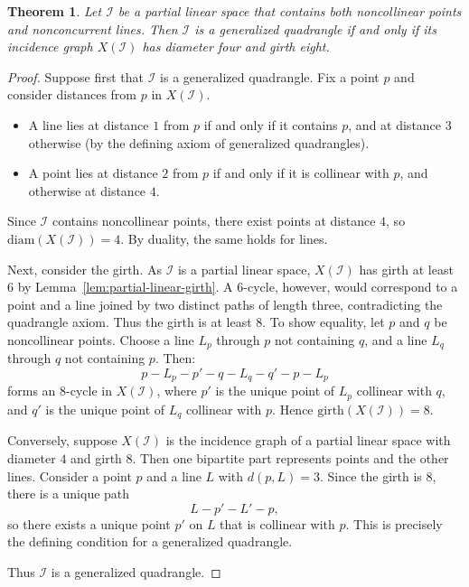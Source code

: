 \documentclass[12pt,a4paper,openany]{book}
\newtheorem{theorem}{Theorem}[section]
\begin{document}
\begin{theorem}\label{thm:gq-graph}
Let $\mathcal{I}$ be a partial linear space that contains both noncollinear points and nonconcurrent lines. Then $\mathcal{I}$ is a generalized quadrangle if and only if its incidence graph $X(\mathcal{I})$ has diameter four and girth eight.
\end{theorem}

\begin{proof}
Suppose first that $\mathcal{I}$ is a generalized quadrangle. Fix a point $p$ and consider distances from $p$ in $X(\mathcal{I})$.  
\begin{itemize}
\item A line lies at distance $1$ from $p$ if and only if it contains $p$, and at distance $3$ otherwise (by the defining axiom of generalized quadrangles).  
\item A point lies at distance $2$ from $p$ if and only if it is collinear with $p$, and otherwise at distance $4$.  
\end{itemize}
Since $\mathcal{I}$ contains noncollinear points, there exist points at distance $4$, so $\mathrm{diam}(X(\mathcal{I}))=4$. By duality, the same holds for lines.  

Next, consider the girth. As $\mathcal{I}$ is a partial linear space, $X(\mathcal{I})$ has girth at least $6$ by Lemma~\ref{lem:partial-linear-girth}. A $6$-cycle, however, would correspond to a point and a line joined by two distinct paths of length three, contradicting the quadrangle axiom. Thus the girth is at least $8$. To show equality, let $p$ and $q$ be noncollinear points. Choose a line $L_p$ through $p$ not containing $q$, and a line $L_q$ through $q$ not containing $p$. Then:  
\[
p  -  L_p  -  p'  -  q  -  L_q  -  q'  -  p  -  L_p
\]
forms an $8$-cycle in $X(\mathcal{I})$, where $p'$ is the unique point of $L_p$ collinear with $q$, and $q'$ is the unique point of $L_q$ collinear with $p$. Hence $\mathrm{girth}(X(\mathcal{I}))=8$.  

Conversely, suppose $X(\mathcal{I})$ is the incidence graph of a partial linear space with diameter $4$ and girth $8$. Then one bipartite part represents points and the other lines. Consider a point $p$ and a line $L$ with $d(p,L)=3$. Since the girth is $8$, there is a unique path
\[
L  -  p'  -  L'  -  p,
\]
so there exists a unique point $p'$ on $L$ that is collinear with $p$. This is precisely the defining condition for a generalized quadrangle.  

Thus $\mathcal{I}$ is a generalized quadrangle.
\end{proof}
\end{document}
